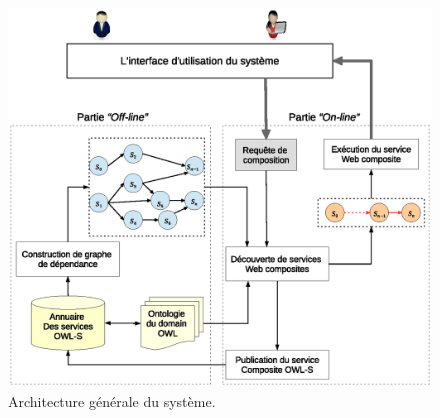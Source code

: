 \begin{figure}[h]
    \centering
    \includegraphics[width=1.15\textwidth]{figs/ch3/architecture.eps}
    \caption{Architecture générale du système.}
    \label{fig:ch3/architecture}
\end{figure}
